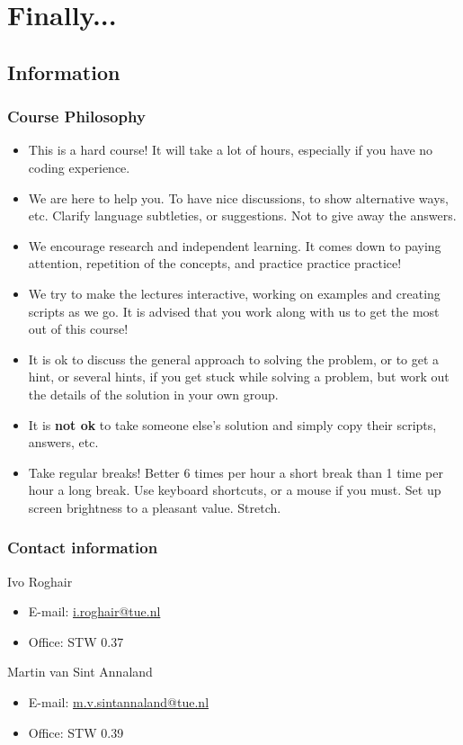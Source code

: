 \section{Finally...}
\subsection{Information}
\begin{frame}
 \frametitle{Course Philosophy}
 \begin{itemize}
  \item This is a hard course! It will take a lot of hours, especially if you have no coding experience.
  \item We are here to help you. To have nice discussions, to show alternative ways, etc. Clarify language subtleties, or suggestions. Not to give away the answers.
  \item We encourage research and independent learning. It comes down to paying attention, repetition of the concepts, and practice practice practice! 
  \item We try to make the lectures interactive, working on examples and creating scripts as we go. It is advised that you work along with us to get the most out of this course!
  \item It is ok to discuss the general approach to solving the problem, or to get a hint, or several hints, if you get stuck while solving a problem, but work out the details of the solution in your own group.
  \item It is {\textbf{not ok}} to take someone else’s solution and simply copy their scripts, answers, etc.
  \item Take regular breaks! Better 6 times per hour a short break than 1 time per hour a long break. Use keyboard shortcuts, or a mouse if you must. Set up screen brightness to a pleasant value. Stretch.
 \end{itemize}
\end{frame}

\begin{frame}
 \frametitle{Contact information}
 \begin{block}{Ivo Roghair}
  \begin{itemize}
   \item E-mail: \href{mailto:i.roghair@tue.nl}{i.roghair@tue.nl}
   \item Office: STW 0.37
   \end{itemize} 
 \end{block}
 \vspace{1em}
  \begin{block}{Martin van Sint Annaland}
  \begin{itemize}
   \item E-mail: \href{mailto:m.v.sintannaland@tue.nl}{m.v.sintannaland@tue.nl}
   \item Office: STW 0.39 
   \end{itemize} 
 \end{block}
\end{frame}


